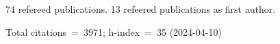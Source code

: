 74 refereed publications. 13 refeered publications as first author.

Total citations~=~3971; h-index~=~35 (2024-04-10)